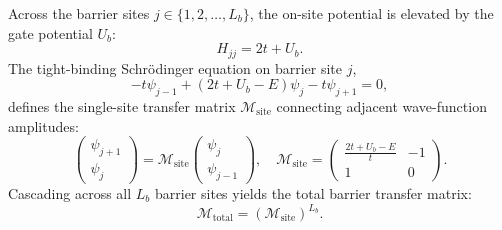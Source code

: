 \documentclass[aps,prb,reprint,superscriptaddress,showpacs,amsmath,amssymb]{revtex4-2}
\begin{document}
Across the barrier sites $j \in \{1, 2, \dots, L_b\}$, the on-site potential is elevated by the gate potential $U_b$:
\begin{equation}
H_{jj} = 2t + U_b.
\label{eq:barrier_onsite}
\end{equation}
The tight-binding Schr\"odinger equation on barrier site $j$,
\begin{equation}
-t \psi_{j-1} + (2t + U_b - E) \psi_j - t \psi_{j+1} = 0,
\label{eq:tb_schrodinger}
\end{equation}
defines the single-site transfer matrix $\mathcal{M}_{\mathrm{site}}$ connecting adjacent wave-function amplitudes:
\begin{equation}
\begin{pmatrix} \psi_{j+1} \\ \psi_j \end{pmatrix} = \mathcal{M}_{\mathrm{site}} \begin{pmatrix} \psi_j \\ \psi_{j-1} \end{pmatrix}, \quad 
\mathcal{M}_{\mathrm{site}} = \begin{pmatrix} \frac{2t + U_b - E}{t} & -1 \\ 1 & 0 \end{pmatrix}.
\label{eq:m_site}
\end{equation}
Cascading across all $L_b$ barrier sites yields the total barrier transfer matrix:
\begin{equation}
\mathcal{M}_{\mathrm{total}} = \left( \mathcal{M}_{\mathrm{site}} \right)^{L_b}.
\label{eq:m_total}
\end{equation}
\end{document}
